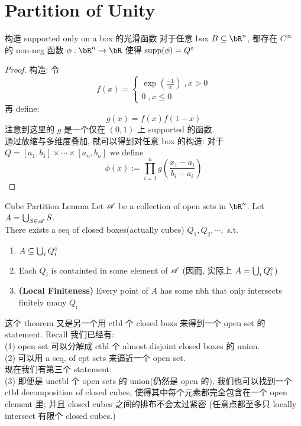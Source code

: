 \section{Partition of Unity}

\begin{lemma}{构造 supported only on a box 的光滑函数}
    对于任意 box $B \sub \bR^n$, 都存在 $C^{\infty}$ 的 non-neg 函数 $\phi: \bR^n \rar \bR$ 使得 $\operatorname{supp}(\phi) = Q^{\circ}$
\end{lemma}
\begin{proof}
    构造:
    令
    $$
    f(x) = 
    \begin{cases}
    \exp(\frac{-1}{x}) \; , x >0 \\
    0 \; , x \leq 0
    \end{cases}
    $$
    再 define:
    $$
    g(x) = f(x)f(1-x)
    $$
    注意到这里的 $g$ 是一个仅在 $(0,1)$ 上 supported 的函数.\\
    通过放缩与多维度叠加, 就可以得到对任意 box 的构造:
    对于 $Q = [a_1, b_1] \times \cdots \times [a_n, b_n]$ we define
    $$
    \phi(x) := \prod_{i = 1}^n g(\frac{x_1 - a_i}{b_i - a_i})
    $$
\end{proof}




\begin{lemma}{Cube Partition Lemma}
Let $\mathscr{A}$ be a collection of open sets in $\bR^n$. Let $A  = \bigcup_{S \in \mathscr{A}} S$.\\
There exists a seq of closed boxes(actually cubes) $Q_1, Q_2, \cdots, $ s.t.
\begin{enumerate}
    \item $A \subseteq \bigcup_{i} Q_i ^{\circ}$
    \item Each $Q_i$ is containted in some element of $\mathscr{A}$ (因而, 实际上 $A  = \bigcup_{i} Q_i ^{\circ}$)
    \item \textbf{(Local Finiteness)} Every point of $A$ has some nbh that only intersects finitely many $Q_i$
\end{enumerate}
\end{lemma}
\begin{remark}
这个 theorem 又是另一个用 ctbl 个 closed boxs 来得到一个 open set 的 statement. Recall 我们已经有:\\
(1) open set 可以分解成 ctbl 个 almost disjoint closed boxes 的 union.\\
(2) 可以用 a seq. of cpt sets 来逼近一个 open set.\\
现在我们有第三个 statement:\\
(3) 即便是 unctbl 个 open sets 的 union(仍然是 open 的), 我们也可以找到一个 ctbl decomposition of closed cubes, 使得其中每个元素都完全包含在一个 open element 里; 并且 closed cubes 之间的排布不会太过紧密 (任意点都至多只 locally intersect 有限个 closed cubes.)\\
\end{remark}

